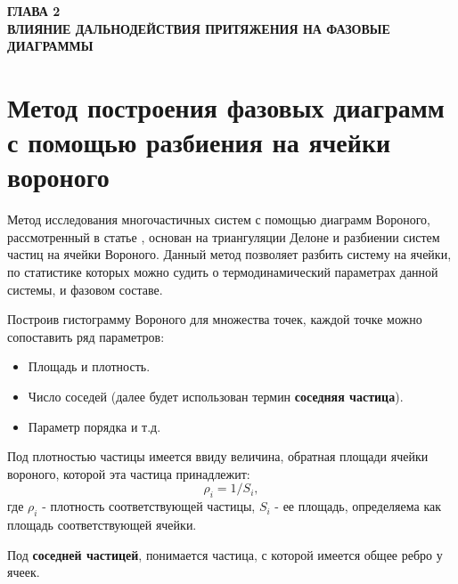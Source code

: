 
\newpage
\begin{center}
\textbf{ГЛАВА 2}\\
\textbf{ВЛИЯНИЕ ДАЛЬНОДЕЙСТВИЯ ПРИТЯЖЕНИЯ НА ФАЗОВЫЕ ДИАГРАММЫ}
\end{center}



\section{Метод построения фазовых диаграмм с помощью разбиения на ячейки вороного}\label{C2_1}

Метод исследования многочастичных систем с помощью диаграмм Вороного, рассмотренный в статье \cite{Ovcharov2017}, основан на триангуляции Делоне и разбиении систем частиц на ячейки Вороного. Данный метод позволяет разбить систему на ячейки, по статистике которых можно судить о термодинамический параметрах данной системы, и фазовом составе.

Построив гистограмму Вороного для множества точек, каждой точке можно сопоставить ряд параметров:
\begin{itemize}
\item Площадь и плотность.
\item Число соседей (далее будет использован термин \textbf{соседняя частица}).
\item Параметр порядка и т.д.
\end{itemize}

Под плотностью частицы имеется ввиду величина, обратная площади ячейки вороного, которой эта частица принадлежит:
\begin{equation}
\rho_i = 1 / S_i,
\label{eqRho}
\end{equation}
где $\rho_i$ - плотность соответствующей частицы, $S_i$ - ее площадь, определяема как площадь соответствующей ячейки.

Под \textbf{соседней частицей}, понимается частица, с которой имеется общее ребро у ячеек.

